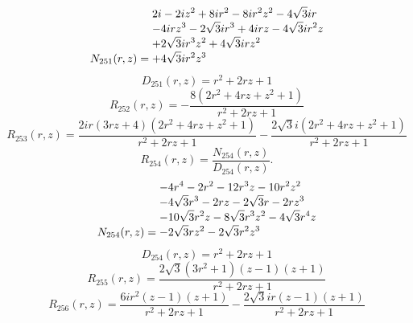 \documentclass[11pt,a4paper]{article}
\begin{document}
\begin{equation}
N_{251}(r,z)=\shortstack[l]{$\displaystyle 2 i - 2 i z^{2} + 8 i r^{2} - 8 i r^{2} z^{2} - 4 \sqrt{3} i r$\\
$\displaystyle  - 4 i r z^{3} - 2 \sqrt{3} i r^{3} + 4 i r z - 4 \sqrt{3} i r^{2} z$\\
$\displaystyle  + 2 \sqrt{3} i r^{3} z^{2} + 4 \sqrt{3} i r z^{2}$\\
$\displaystyle  + 4 \sqrt{3} i r^{2} z^{3}$}
\label{eq:cat-numerator-251}
\end{equation}
\begin{equation}
D_{251}(r,z)=r^{2} + 2 r z + 1
\label{eq:cat-denominator-251}
\end{equation}
\begin{equation}
R_{252}(r,z)=- \frac{8 \left(2 r^{2} + 4 r z + z^{2} + 1\right)}{r^{2} + 2 r z + 1}
\label{eq:cat-rational-252}
\end{equation}
\begin{equation}
R_{253}(r,z)=\frac{2 i r \left(3 r z + 4\right) \left(2 r^{2} + 4 r z + z^{2} + 1\right)}{r^{2} + 2 r z + 1} - \frac{2 \sqrt{3} i \left(2 r^{2} + 4 r z + z^{2} + 1\right)}{r^{2} + 2 r z + 1}
\label{eq:cat-rational-253}
\end{equation}
\begin{equation}
R_{254}(r,z)=\frac{N_{254}(r,z)}{D_{254}(r,z)}.
\label{eq:cat-rational-254}
\end{equation}
\begin{equation}
N_{254}(r,z)=\shortstack[l]{$\displaystyle  - 4 r^{4} - 2 r^{2} - 12 r^{3} z - 10 r^{2} z^{2}$\\
$\displaystyle  - 4 \sqrt{3} r^{3} - 2 r z - 2 \sqrt{3} r - 2 r z^{3}$\\
$\displaystyle  - 10 \sqrt{3} r^{2} z - 8 \sqrt{3} r^{3} z^{2} - 4 \sqrt{3} r^{4} z$\\
$\displaystyle  - 2 \sqrt{3} r z^{2} - 2 \sqrt{3} r^{2} z^{3}$}
\label{eq:cat-numerator-254}
\end{equation}
\begin{equation}
D_{254}(r,z)=r^{2} + 2 r z + 1
\label{eq:cat-denominator-254}
\end{equation}
\begin{equation}
R_{255}(r,z)=\frac{2 \sqrt{3} \left(3 r^{2} + 1\right) \left(z - 1\right) \left(z + 1\right)}{r^{2} + 2 r z + 1}
\label{eq:cat-rational-255}
\end{equation}
\begin{equation}
R_{256}(r,z)=\frac{6 i r^{2} \left(z - 1\right) \left(z + 1\right)}{r^{2} + 2 r z + 1} - \frac{2 \sqrt{3} i r \left(z - 1\right) \left(z + 1\right)}{r^{2} + 2 r z + 1}
\label{eq:cat-rational-256}
\end{equation}
\end{document}
